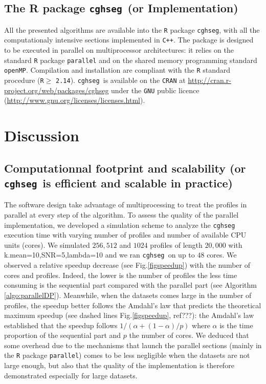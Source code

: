 \documentclass{llncs}
\newcommand{\soft}{\texttt{cghseg}}
\newcommand{\esoft}{\texttt{cghseg }}
\begin{document}
\subsection{The R package \esoft (or Implementation)}
All the presented algorithms are available into the \texttt{R} package \soft, with all the computationaly intensive sections implemented in \texttt{C++}.
The package is designed to be executed in parallel on multiprocessor architectures: 
it relies on the standard \texttt{R} package \texttt{parallel} and on the shared memory programming standard \texttt{openMP}.
Compilation and installation are compliant with the \texttt{R} standard procedure (\texttt{R}$\geq$ \texttt{2.14}). 
\esoft is available on the \texttt{CRAN} at \url{http://cran.r-project.org/web/packages/cghseg} under the \texttt{GNU} public licence 
(\url{http://www.gnu.org/licenses/licenses.html}).


\section{Discussion}
\subsection{Computationnal footprint and scalability (or \esoft is efficient and scalable in practice)}

The software design take advantage of multiprocessing to treat the profiles in parallel at every step of the algorithm.
To assess the quality of the parallel implementation, we developed a simulation scheme to analyze the \esoft execution time 
with varying number of profiles and number of available CPU units (cores).
We simulated $256, 512$ and $1024$ profiles of length $20,000$ with k.mean=10,SNR=5,lambda=10 and we ran \esoft on up to $48$ cores.
We observed a relative speedup decrease (see Fig.\ref{figspeedup}) with the number of cores and profiles. Indeed, the lower is the number of profiles the less time consuming is the sequential part compared with the parallel part (see Algorithm \ref{algo:parallelDP}). Meanwhile, when the datasets comes large in the number of profiles, the speedup better follows the Amdahl's law that predicts the theoretical maximum speedup (see dashed lines Fig.\ref{figspeedup}, ref???): the Amdahl's law established that the speedup follows $1/(\alpha+(1-\alpha)/p)$ where $\alpha$ is the time proportion of the sequential part and $p$ the number of cores. We deduced that some overhead due to the mechanisms that launch the parallel sections (mainly in the \texttt{R} package \texttt{parallel}) comes to be less negligible when the datasets are not large enough, but also that the quality of the implementation is therefore demonstrated especially for large datasets.
\end{document}
